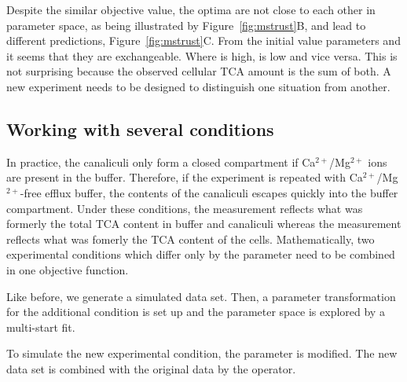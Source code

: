 \documentclass[article]{jss}
\begin{document}
Despite the similar objective value, the optima are not close to each other in parameter space, as being illustrated by Figure~\ref{fig:mstrust}B, and lead to different predictions, Figure~\ref{fig:mstrust}C. From the initial value parameters  and  it seems that they are exchangeable. Where  is high,  is low and vice versa. This is not surprising because the observed cellular TCA amount is the sum of both. A new experiment needs to be designed to distinguish one situation from another.

\subsection{Working with several conditions}\label{sec:conditions}

In practice, the canaliculi only form a closed compartment if Ca$^{2+}$/Mg$^{2+}$ ions are present in the buffer. Therefore, if the experiment is repeated with Ca$^{2+}$/Mg$^{2+}$-free efflux buffer, the contents of the canaliculi escapes quickly into the buffer compartment. Under these conditions, the  measurement reflects what was formerly the total TCA content in buffer and canaliculi whereas the  measurement reflects what was fomerly the TCA content of the cells.
Mathematically, two experimental conditions which differ only by the  parameter need to be combined in one objective function.

Like before, we generate a simulated data set. Then, a parameter transformation for the additional condition is set up and the parameter space is explored by a multi-start fit.

To simulate the new experimental condition, the  parameter is modified. The new data set is combined with the original data by the  operator.

\begin{CodeChunk}
\end{CodeChunk}
\end{document}
